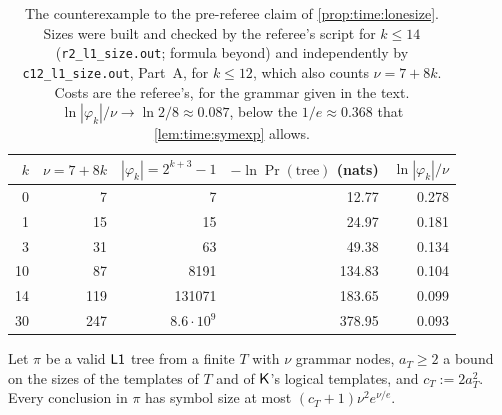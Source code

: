 \begin{table}[ht]
\centering\small
\begin{tabular}{@{}rrrrr@{}}
\toprule
$k$ & $\nu=7+8k$ & $|\varphi_k|=2^{k+3}-1$ & $-\ln\Pr(\text{tree})$ (nats) & $\ln|\varphi_k|/\nu$ \\
\midrule
0 & 7 & 7 & 12.77 & 0.278 \\
1 & 15 & 15 & 24.97 & 0.181 \\
3 & 31 & 63 & 49.38 & 0.134 \\
10 & 87 & 8191 & 134.83 & 0.104 \\
14 & 119 & 131071 & 183.65 & 0.099 \\
30 & 247 & $8.6\cdot10^9$ & 378.95 & 0.093 \\
\bottomrule
\end{tabular}
\caption{The counterexample to the pre-referee claim of \cref{prop:time:lonesize}. Sizes were built and checked by the referee's script for $k\le14$ (\texttt{r2\_l1\_size.out}; formula beyond) and independently by \texttt{c12\_l1\_size.out}, Part~A, for $k\le12$, which also counts $\nu=7+8k$. Costs are the referee's, for the grammar given in the text. $\ln|\varphi_k|/\nu\to\ln2/8\approx0.087$, below the $1/e\approx0.368$ that \cref{lem:time:symexp} allows.}\label{tab:time:c12}
\end{table}

\begin{lemma}\label{lem:time:symexp}
Let $\pi$ be a valid $\mathord{\mathsf{L1}}$ tree from a finite $T$ with $\nu$ grammar nodes, $a_T\ge2$ a bound on the sizes of the templates of $T$ and of $\mathsf{K}$'s logical templates, and $c_T:=2a_T^2$. Every conclusion in $\pi$ has symbol size at most $(c_T+1)\nu^2e^{\nu/e}$.
\end{lemma}

